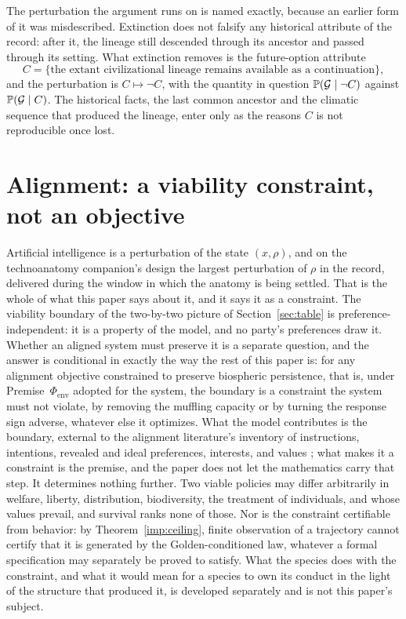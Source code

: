 The perturbation the argument runs on is named exactly, because an
earlier form of it was misdescribed. Extinction does not falsify any
historical attribute of the record: after it, the lineage still
descended through its ancestor and passed through its setting. What
extinction removes is the future-option attribute
\[
C=\{\text{the extant civilizational lineage remains available as a continuation}\},
\]
and the perturbation is $C\mapsto\neg C$, with the quantity in question
$\mathbb{P}(\mathcal G\mid\neg C)$ against $\mathbb{P}(\mathcal G\mid C)$. The
historical facts, the last common ancestor and the climatic sequence
that produced the lineage, enter only as the reasons $C$ is not
reproducible once lost.

\section{Alignment: a viability constraint, not an objective}\label{sec:alignment}

Artificial intelligence is a perturbation of the state $(x,\rho)$, and
on the technoanatomy companion's design the largest perturbation of
$\rho$ in the record, delivered during the window in which the
anatomy is being settled. That is the whole of what this paper says
about it, and it says it as a constraint. The viability boundary of the two-by-two picture of
Section~\ref{sec:table} is preference-independent: it is a property of
the model, and no party's preferences draw it. Whether an aligned
system must preserve it is a separate question, and the answer is
conditional in exactly the way the rest of this paper is: for any
alignment objective constrained to preserve biospheric persistence,
that is, under Premise~$\Phi_{\mathrm{env}}$ adopted for the system,
the boundary is a constraint the system must not violate, by removing
the muffling capacity or by turning the response sign adverse, whatever
else it optimizes. What the model contributes is the boundary, external
to the alignment literature's inventory of instructions, intentions,
revealed and ideal preferences, interests, and values
\cite{Gabriel20}; what makes it a constraint is the premise, and the
paper does not let the mathematics carry that step. It determines
nothing further. Two viable policies may differ arbitrarily
in welfare, liberty, distribution, biodiversity, the treatment of
individuals, and whose values prevail, and survival ranks none of
those. Nor is the constraint certifiable from behavior: by
Theorem~\ref{imp:ceiling}, finite observation of a trajectory cannot
certify that it is generated by the Golden-conditioned law, whatever a
formal specification may separately be proved to satisfy. What the
species does with the constraint, and what it would mean for a species
to own its conduct in the light of the structure that produced it, is
developed separately and is not this paper's subject.

